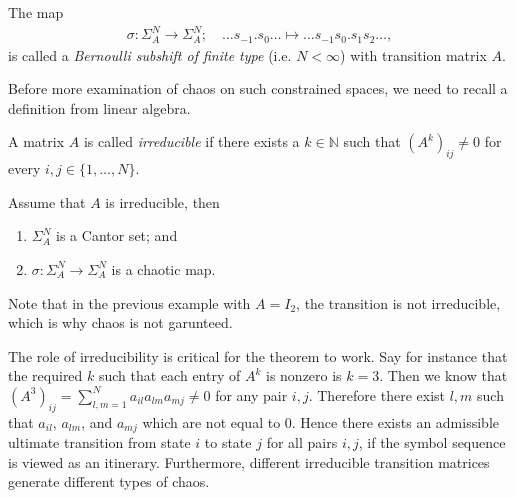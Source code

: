 \begin{definition}
	The map
	\begin{align}
		\sigma:\Sigma_{A}^{N}\to \Sigma_{A}^{N};\quad \ldots s_{-1}\bm{.} s_0 \ldots \mapsto \ldots s_{-1} s_0 \bm{.} s_1 s_2 \ldots,
	\end{align}
	is called a \emph{Bernoulli subshift of finite type} (i.e. $N< \infty $) with transition matrix $A$.
\end{definition}
Before more examination of chaos on such constrained spaces, we need to recall a definition from linear algebra.
\begin{definition}
	A matrix $A$ is called \emph{irreducible} if there exists a $k \in \mathbb{N}$ such that $\left(A^{k}\right)_{ij}\neq 0$ for every $i,j\in \{1,\ldots,N\}$.
\end{definition}

\begin{theorem}[]
	Assume that $A$ is irreducible, then 
	\begin{enumerate}
		\item $\Sigma_{A}^{N}$ is a Cantor set; and
		\item $\sigma:\Sigma_{A}^{N}\to \Sigma_{A}^{N}$ is a chaotic map.
	\end{enumerate}
\end{theorem}

Note that in the previous example with $A=I_{2}$, the transition is not irreducible, which is why chaos is not garunteed.

The role of irreducibility is critical for the theorem to work. Say for instance that the required $k$ such that each entry of $A^{k}$ is nonzero is $k=3$. Then we know that $\left(A^{3}\right)_{ij} = \sum_{l,m=1}^{N} a_{il}a_{lm}a_{mj} \neq 0$ for any pair $i,j$. Therefore there exist $l,m$ such that $a_{il}$, $a_{lm}$, and $a_{mj}$ which are not equal to 0. Hence there exists an admissible ultimate transition from state $i$ to state $j$ for all pairs $i,j$, if the symbol sequence is viewed as an itinerary. Furthermore, different irreducible transition matrices generate different types of chaos. 

